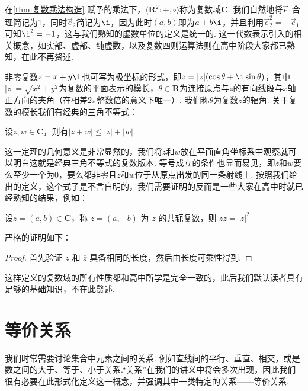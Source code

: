 在\autoref{thm:复数乘法构造} 赋予的乘法下，$\langle\mathbf{R}^2:+,\circ\rangle$称为复数域$\mathbf{C}$. 我们自然地将$\vec{e}_1$合理简记为1，同时$\vec{e}_2$简记为$\i$，因为此时$(a,b)$即为$a+b\i$，并且利用$\vec{e}_2^2=-\vec{e}_1$可知$\i^2=-1$，这与我们熟知的虚数单位的定义是统一的. 这一代数表示引入的相关概念，如实部、虚部、纯虚数，以及复数四则运算法则在高中阶段大家都已熟知，在此不再赘述.

非零复数$z=x+y\i$也可写为极坐标的形式，即$z=|z|(\cos\theta+\i\sin\theta)$，其中$|z|=\sqrt{x^2+y^2}$为复数的平面表示的模长，$\theta\in\mathbf{R}$为连接原点与$z$的有向线段与$x$轴正方向的夹角（在相差$2\pi$整数倍的意义下唯一）. 我们称$\theta$为复数$z$的辐角. 关于复数的模长我们有经典的三角不等式：
\begin{theorem}{}{}
    设$z,w\in\mathbf{C}$，则有$|z+w|\leqslant|z|+|w|$.
\end{theorem}

这一定理的几何意义是非常显然的，我们将$z$和$w$放在平面直角坐标系中观察就可以明白这就是经典三角不等式的复数版本. 等号成立的条件也显而易见，即$z$和$w$要么至少一个为0，要么都非零且$z$和$w$位于从原点出发的同一条射线上. 按照我们给出的定义，这个式子是不言自明的，我们需要证明的反而是一些大家在高中时就已经熟知的结果，例如：

\begin{theorem}{}{}
    设$z = (a, b) \in \mathbf{C}$，称 $\overline{z} = (a, -b)$ 为 $z$ 的共轭复数，则 $\overline{z} z = |z|^2$
\end{theorem}

严格的证明如下：

\begin{proof}
    首先验证 $z$ 和 $\overline{z}$ 具备相同的长度，然后由长度可乘性得到.
\end{proof}

这样定义的复数域的所有性质都和高中所学是完全一致的，此后我们默认读者具有足够的基础知识，不在此赘述.

\section{等价关系}

我们时常需要讨论集合中元素之间的关系. 例如直线间的平行、垂直、相交，或是数之间的大于、等于、小于关系.``关系''在我们的讲义中将会多次出现，因此我们很有必要在此形式化定义这一概念，并强调其中一类特定的关系——等价关系.

